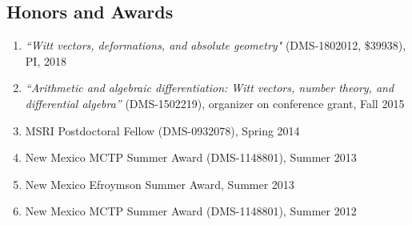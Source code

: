 \documentclass[a4paper,10pt]{article}
\begin{document}
\subsection*{Honors and Awards}
\begin{enumerate} \addtolength{\itemsep}{-0.5\baselineskip}
\item \emph{``Witt vectors, deformations, and absolute geometry"} (DMS-1802012, \$39938), PI, 2018
\item \emph{``Arithmetic and algebraic differentiation: Witt vectors, number theory, and differential algebra''} (DMS-1502219), organizer on conference grant, Fall 2015  
 \item MSRI Postdoctoral Fellow (DMS-0932078), Spring 2014
\item New Mexico MCTP Summer Award (DMS-1148801), Summer 2013 
\item New Mexico Efroymson Summer Award, Summer 2013 
 \item New Mexico MCTP Summer Award (DMS-1148801), Summer 2012 
\end{enumerate}
\end{document}
